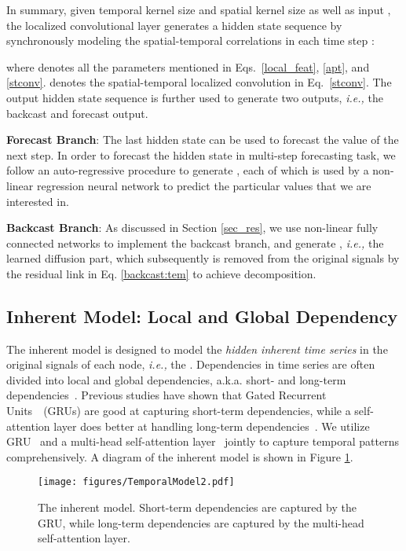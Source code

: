 \documentclass[sigconf, nonacm]{acmart}
\newcommand{\ie}{\textit{i.e.,}\xspace}
\begin{document}
In summary, given temporal kernel size  and spatial kernel size  as well as input , the localized {\color{black}convolutional} layer generates a hidden state sequence  by synchronously modeling the spatial-temporal correlations in {\color{black}each time step }:

where  denotes all the parameters mentioned in Eqs.~\ref{local_feat}, \ref{apt}, and \ref{stconv}.
{\color{black} denotes the spatial-temporal localized convolution in Eq.~\ref{stconv}.}
The output hidden state sequence  is further used to generate two outputs, \ie the backcast and forecast output.

\noindent\textbf{Forecast Branch}: The last hidden state  can be used to forecast the value of the next step. 
In order to forecast the hidden state in multi-step forecasting task, we follow an auto-regressive procedure to generate , each of which is used by a non-linear regression neural network to predict the particular values that we are interested in. 

\noindent\textbf{Backcast Branch}: 
{\color{black}
As discussed in Section \ref{sec_res}, we use non-linear fully connected networks to implement the backcast branch, and generate , \ie the learned {\color{black}diffusion} part, which subsequently is removed from the original signals by the residual link in Eq. \ref{backcast:tem} to achieve decomposition.}
 \subsection{{\color{black}Inherent} Model: Local and Global Dependency}
The {\color{black}inherent model is designed to model the \textit{hidden inherent time series} in the original signals of each node, \ie the }. 
Dependencies in time series are often divided into local and global dependencies, a.k.a. short- and long-term dependencies~\cite{2020STGNN, 2020NBeats, TrendPeriodic}.
Previous studies have shown that Gated Recurrent Units~\cite{2014GRU}~(GRUs) are good at capturing short-term dependencies, while a self-attention layer does better at handling long-term dependencies~\cite{2020STGNN}.
We utilize GRU~\cite{2014GRU} and a multi-head self-attention layer~\cite{2017Transformer} jointly to capture temporal patterns comprehensively.
A diagram of the {\color{black}inherent} model is shown in Figure \ref{temporal}.
\begin{figure}[h]
  \setlength{\abovecaptionskip}{0.2cm}
\centering
  \texttt{[image: figures/TemporalModel2.pdf]}
  \caption{The {\color{black}inherent} model. Short-term dependencies are captured by the GRU, while long-term dependencies are captured by the multi-head self-attention layer.}
  \label{temporal}
\end{figure}
\end{document}
